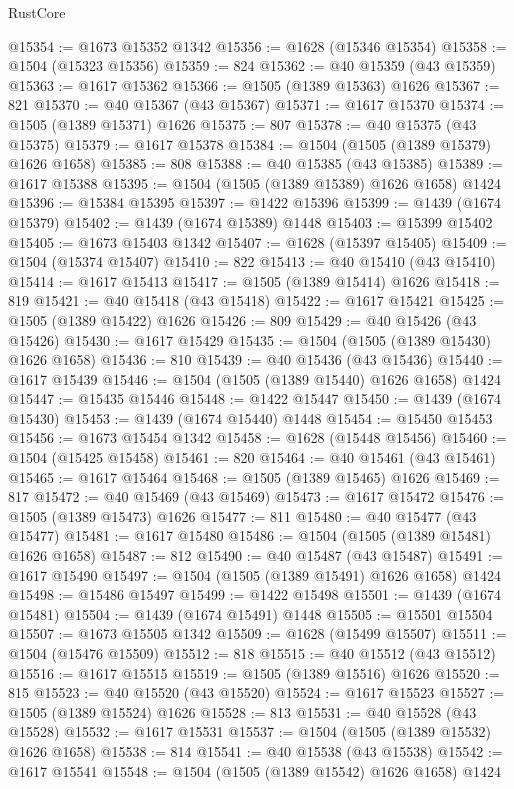 \begin{lexlean}{RustCore}
\begin{coremodule}
@15354 := @1673 @15352 @1342
@15356 := @1628 (@15346 @15354)
@15358 := @1504 (@15323 @15356)
@15359 := 824
@15362 := @40 @15359 (@43 @15359)
@15363 := @1617 @15362
@15366 := @1505 (@1389 @15363) @1626
@15367 := 821
@15370 := @40 @15367 (@43 @15367)
@15371 := @1617 @15370
@15374 := @1505 (@1389 @15371) @1626
@15375 := 807
@15378 := @40 @15375 (@43 @15375)
@15379 := @1617 @15378
@15384 := @1504 (@1505 (@1389 @15379) @1626 @1658)
@15385 := 808
@15388 := @40 @15385 (@43 @15385)
@15389 := @1617 @15388
@15395 := @1504 (@1505 (@1389 @15389) @1626 @1658) @1424
@15396 := @15384 @15395
@15397 := @1422 @15396
@15399 := @1439 (@1674 @15379)
@15402 := @1439 (@1674 @15389) @1448
@15403 := @15399 @15402
@15405 := @1673 @15403 @1342
@15407 := @1628 (@15397 @15405)
@15409 := @1504 (@15374 @15407)
@15410 := 822
@15413 := @40 @15410 (@43 @15410)
@15414 := @1617 @15413
@15417 := @1505 (@1389 @15414) @1626
@15418 := 819
@15421 := @40 @15418 (@43 @15418)
@15422 := @1617 @15421
@15425 := @1505 (@1389 @15422) @1626
@15426 := 809
@15429 := @40 @15426 (@43 @15426)
@15430 := @1617 @15429
@15435 := @1504 (@1505 (@1389 @15430) @1626 @1658)
@15436 := 810
@15439 := @40 @15436 (@43 @15436)
@15440 := @1617 @15439
@15446 := @1504 (@1505 (@1389 @15440) @1626 @1658) @1424
@15447 := @15435 @15446
@15448 := @1422 @15447
@15450 := @1439 (@1674 @15430)
@15453 := @1439 (@1674 @15440) @1448
@15454 := @15450 @15453
@15456 := @1673 @15454 @1342
@15458 := @1628 (@15448 @15456)
@15460 := @1504 (@15425 @15458)
@15461 := 820
@15464 := @40 @15461 (@43 @15461)
@15465 := @1617 @15464
@15468 := @1505 (@1389 @15465) @1626
@15469 := 817
@15472 := @40 @15469 (@43 @15469)
@15473 := @1617 @15472
@15476 := @1505 (@1389 @15473) @1626
@15477 := 811
@15480 := @40 @15477 (@43 @15477)
@15481 := @1617 @15480
@15486 := @1504 (@1505 (@1389 @15481) @1626 @1658)
@15487 := 812
@15490 := @40 @15487 (@43 @15487)
@15491 := @1617 @15490
@15497 := @1504 (@1505 (@1389 @15491) @1626 @1658) @1424
@15498 := @15486 @15497
@15499 := @1422 @15498
@15501 := @1439 (@1674 @15481)
@15504 := @1439 (@1674 @15491) @1448
@15505 := @15501 @15504
@15507 := @1673 @15505 @1342
@15509 := @1628 (@15499 @15507)
@15511 := @1504 (@15476 @15509)
@15512 := 818
@15515 := @40 @15512 (@43 @15512)
@15516 := @1617 @15515
@15519 := @1505 (@1389 @15516) @1626
@15520 := 815
@15523 := @40 @15520 (@43 @15520)
@15524 := @1617 @15523
@15527 := @1505 (@1389 @15524) @1626
@15528 := 813
@15531 := @40 @15528 (@43 @15528)
@15532 := @1617 @15531
@15537 := @1504 (@1505 (@1389 @15532) @1626 @1658)
@15538 := 814
@15541 := @40 @15538 (@43 @15538)
@15542 := @1617 @15541
@15548 := @1504 (@1505 (@1389 @15542) @1626 @1658) @1424

\end{coremodule}
\end{lexlean}
